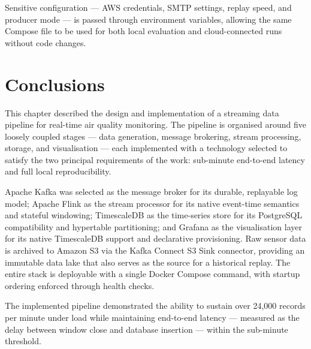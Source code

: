 Sensitive configuration — AWS credentials, SMTP settings, replay speed, and producer mode — is passed through environment variables, allowing the same Compose file to be used for both local evaluation and cloud-connected runs without code changes.

\section{Conclusions}

This chapter described the design and implementation of a streaming data pipeline for real-time air quality monitoring. The pipeline is organised around five loosely coupled stages — data generation, message brokering, stream processing, storage, and visualisation — each implemented with a technology selected to satisfy the two principal requirements of the work: sub-minute end-to-end latency and full local reproducibility.

Apache Kafka was selected as the message broker for its durable, replayable log model; Apache Flink as the stream processor for its native event-time semantics and stateful windowing; TimescaleDB as the time-series store for its PostgreSQL compatibility and hypertable partitioning; and Grafana as the visualisation layer for its native TimescaleDB support and declarative provisioning. Raw sensor data is archived to Amazon S3 via the Kafka Connect S3 Sink connector, providing an immutable data lake that also serves as the source for a historical replay. The entire stack is deployable with a single Docker Compose command, with startup ordering enforced through health checks.

The implemented pipeline demonstrated the ability to sustain over 24,000 records per minute under load while maintaining end-to-end latency — measured as the delay between window close and database insertion — within the sub-minute threshold.
